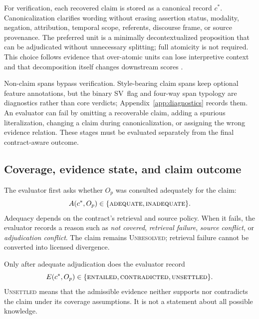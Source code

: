 \documentclass{clv2025}
\newcommand{\SV}{\textsc{SV}}
\newcommand{\UNR}{\textsc{Unresolved}}
\begin{document}
For verification, each recovered claim is stored as a canonical record $c^*$.
Canonicalization clarifies wording without erasing assertion status, modality, negation, attribution, temporal scope, referents, discourse frame, or source provenance.
The preferred unit is a minimally decontextualized proposition that can be adjudicated without unnecessary splitting; full atomicity is not required.
This choice follows evidence that over-atomic units can lose interpretive context and that decomposition itself changes downstream scores \citep{gunjal_molecular_2024,wanner_closer_2024}.

Non-claim spans bypass verification.
Style-bearing claim spans keep optional feature annotations, but the binary \SV\ flag and four-way span typology are diagnostics rather than core verdicts; Appendix~\ref{app:diagnostics} records them.
An evaluator can fail by omitting a recoverable claim, adding a spurious literalization, changing a claim during canonicalization, or assigning the wrong evidence relation.
These stages must be evaluated separately from the final contract-aware outcome.

\subsection{Coverage, evidence state, and claim outcome}

The evaluator first asks whether $O_p$ was consulted adequately for the claim:
\begin{equation}
 A(c^*,O_p)\in\{\textsc{adequate},\textsc{inadequate}\}.
 \label{eq:coverage}
\end{equation}
Adequacy depends on the contract's retrieval and source policy.
When it fails, the evaluator records a reason such as \emph{not covered},
\emph{retrieval failure}, \emph{source conflict}, or \emph{adjudication
conflict}.
The claim remains \UNR; retrieval failure cannot be converted into
licensed divergence.

Only after adequate adjudication does the evaluator record
\begin{equation}
 E(c^*,O_p)\in
 \{\textsc{entailed},\textsc{contradicted},\textsc{unsettled}\}.
 \label{eq:evidence}
\end{equation}
\textsc{Unsettled} means that the admissible evidence neither supports nor
contradicts the claim under its coverage assumptions.
It is not a statement about all possible knowledge.
\end{document}
